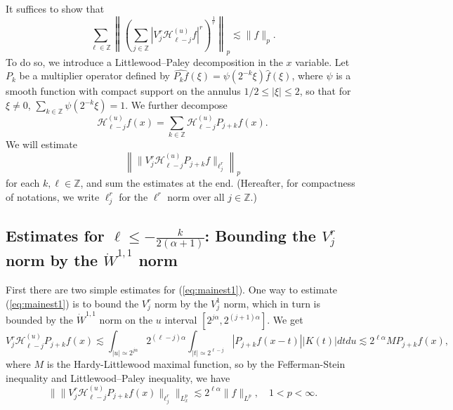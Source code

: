 \documentclass[12pt,leqno]{amsart}
\def\Z{\mathbb{Z}}
\theoremstyle{plain}
\numberwithin{equation}{section}
\begin{document}
It suffices to show that
\begin{equation} \label{eq:mainest}
\sum_{\ell \in \Z} \left\| \left(\sum_{j\in \Z} |V_j^{r} \mathcal{H}^{(u)}_{\ell-j} f |^{r} \right)^{\frac{1}{r}}\right\|_p \lesssim \|f\|_p.
\end{equation}
To do so, we introduce a Littlewood--Paley decomposition in the $x$ variable. Let $P_k$ be a multiplier operator defined by $\widehat{P_k f}(\xi) =   \psi  (2^{-k} \xi) \widehat{f}(\xi)$, where $  \psi  $ is a smooth function with compact support on the annulus $1/2 \leq |\xi| \leq 2$, so that for $\xi \ne 0$, $\sum_{k \in \Z}   \psi  (2^{-k} \xi) = 1$. We further decompose 
\begin{equation} \label{eq:decompk}
\mathcal{H}^{(u)}_{\ell-j} f(x) = \sum_{k \in \Z} \mathcal{H}^{(u)}_{\ell-j} P_{j+k} f(x).
\end{equation}
We will estimate
\begin{equation} \label{eq:mainest1}
\left\| \|V_j^{r} \mathcal{H}^{(u)}_{\ell-j} P_{j+k} f \|_{\ell^r_j} \right\|_p 
\end{equation}
for each $k, \ell \in \Z$, and sum the estimates at the end. (Hereafter, for compactness of notations, we write $\ell^r_j$ for the $\ell^r$ norm over all $j \in \Z$.)

\subsection{Estimates for $\ell \leq -\frac{k}{2(\alpha+1)}$: Bounding the $V^r_j$ norm by the $\dot{W}^{1,1}$ norm} \label{sect4.2}

First there are two simple estimates for (\ref{eq:mainest1}). One way to estimate (\ref{eq:mainest1}) is to bound the $V^{r}_j$ norm by the $V^1_j$ norm, which in turn is bounded by the $\dot{W}^{1,1}$ norm on the $u$ interval $[2^{j\alpha}, 2^{(j+1)\alpha}]$. We get 
\[
V^{r}_j \mathcal{H}^{(u)}_{\ell-j} P_{j+k} f(x) 
\lesssim \int_{|u| \simeq 2^{j\alpha}} 2^{(\ell - j)\alpha} \int_{|t| \simeq 2^{\ell-j}} |P_{j+k} f(x-t)| |K(t)| dt du
\lesssim 2^{\ell \alpha} M P_{j+k} f(x),
\]
where $M$ is the Hardy-Littlewood maximal function, so by the Fefferman-Stein inequality and Littlewood--Paley inequality, we have
\begin{equation} \label{est1}
\| \| V^{r}_j \mathcal{H}^{(u)}_{\ell-j} P_{j+k} f(x) \|_{\ell^{r}_j} \|_{L^p_x} 
\lesssim 2^{\ell \alpha} \|f\|_{L^p}, \quad 1 < p < \infty.
\end{equation} 
\end{document}
